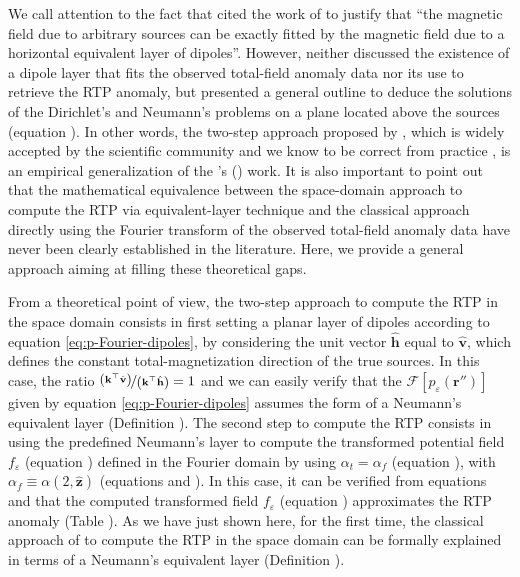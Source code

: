 We call attention to the fact that \citet{silva1986} cited the work of \citet{roy1962} to justify that ``the magnetic 
field due to arbitrary sources can be exactly fitted by the magnetic field due to a horizontal equivalent
layer of dipoles''. 
However, \citeauthor{roy1962} neither discussed the existence of a dipole layer that fits the observed total-field 
anomaly data nor its use to retrieve the RTP anomaly, but 
presented a general outline to deduce the solutions of the Dirichlet's and Neumann's problems on a plane 
located above the sources (equation ).
In other words, the two-step approach proposed by \citet{silva1986}, which is widely accepted by the scientific community 
and we know to be correct from practice 
\citep[e.g., ][]{leao-silva_1989, guspi_novara2009, oliveirajr_etal2013, li_etal2014, reis_etal2020, takahashi-etal2022, piauilino_etal2025}, 
is an empirical generalization of the \citeauthor{roy1962}'s (\citeyear{roy1962}) work. 
It is also important to point out that the mathematical equivalence between the space-domain approach to compute the 
RTP via equivalent-layer technique and the classical approach directly using the Fourier transform of the observed 
total-field anomaly data \citep[e.g., ][ p. 331]{blakely1996} have never been clearly established in the literature.
Here, we provide a general approach aiming at filling these theoretical gaps.

From a theoretical point of view, the two-step approach to compute the RTP in the space domain 
consists in first setting a planar layer of dipoles according to equation \ref{eq:p-Fourier-dipoles}, 
by considering the unit vector $\hat{\mathbf{h}}$ equal to $\hat{\mathbf{v}}$, which defines 
the constant total-magnetization direction of the true sources.
In this case, the ratio $\nicefrac{\left(\mathbf{k}^{\top} \hat{\mathbf{v}} \right)}{\left(\mathbf{k}^{\top} \hat{\mathbf{h}} \right)} = 1$ 
and we can easily verify that the $\mathcal{F} [ p_{\varepsilon}(\mathbf{r}'') ]$ given by 
equation \ref{eq:p-Fourier-dipoles} assumes the form of a Neumann's equivalent layer (Definition ).
The second step to compute the RTP consists in using the predefined Neumann's layer to compute 
the transformed potential field $f_{\varepsilon}$ (equation ) defined in the Fourier domain 
by using $\alpha_{t} = \alpha_{f}$ (equation ), with 
$\alpha_{f} \equiv \alpha(2, \hat{\mathbf{z}})$ (equations  and ).
In this case, it can be verified from equations  and  
that the computed transformed field $f_{\varepsilon}$ (equation ) 
approximates the RTP anomaly  (Table ). 
As we have just shown here, for the first time, the classical approach of \citet{silva1986} to compute the RTP in the 
space domain can be formally explained in terms of a Neumann's equivalent layer (Definition ). 

